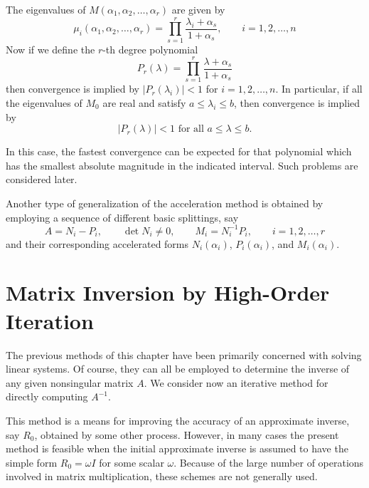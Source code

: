 \documentclass[../main.tex]{subfiles}
\begin{document}
The eigenvalues of $M(\alpha_1, \alpha_2, \ldots, \alpha_r)$ are given by
\begin{equation}
	\mu_i(\alpha_1, \alpha_2, \ldots, \alpha_r) = \prod_{s=1}^r \frac{\lambda_i + \alpha_s}{1 + \alpha_s}, \qquad i = 1, 2, \ldots, n
\end{equation}
Now if we define the $r$-th degree polynomial
\begin{equation*}
	P_r(\lambda) = \prod_{s=1}^r \frac{\lambda + \alpha_s}{1 + \alpha_s}
\end{equation*}
then convergence is implied by $| P_r(\lambda_i) | < 1$ for $i = 1, 2, \ldots, n$. In particular, if all the eigenvalues of $M_0$ are real and satisfy $a \leq \lambda_i \leq b$, then convergence is implied by
\begin{equation}
	| P_r(\lambda) | < 1 \text{ for all } a \leq \lambda \leq b.
\end{equation}

In this case, the fastest convergence can be expected for that polynomial which has the smallest absolute magnitude in the indicated interval. Such problems are considered later.

Another type of generalization of the acceleration method is obtained by employing a sequence of different basic splittings, say
\begin{equation*}
	A = N_i - P_i, \qquad \det N_i \neq 0, \qquad M_i = N_i^{-1} P_i, \qquad i = 1, 2, \ldots, r
\end{equation*}
and their corresponding accelerated forms $N_i(\alpha_i)$, $P_i(\alpha_i)$, and $M_i(\alpha_i)$.

\section{Matrix Inversion by High-Order Iteration}
The previous methods of this chapter have been primarily concerned with solving linear systems. Of course, they can all be employed to determine the inverse of any given nonsingular matrix $A$. We consider now an iterative method for directly computing $A^{-1}$.

This method is a means for improving the accuracy of an approximate inverse, say $R_0$, obtained by some other process. However, in many cases the present method is feasible when the initial approximate inverse is assumed to have the simple form $R_0 = \omega I$ for some scalar $\omega$. Because of the large number of operations involved in matrix multiplication, these schemes are not generally used.
\end{document}
